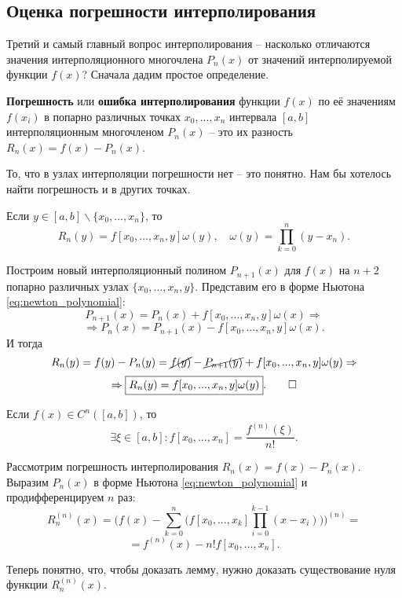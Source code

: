 \documentclass[../main.tex]{subfile}
\begin{document}
\subsection{Оценка погрешности интерполирования}
Третий и самый главный вопрос интерполирования -- насколько отличаются значения
интерполяционного многочлена $P_n(x)$ от значений интерполируемой функции
$f(x)$? Сначала дадим простое определение.

\begin{define}\label{eq:interpolation_error}
	\textbf{Погрешность} или \textbf{ошибка интерполирования} функции $f(x)$
	по её значениям $f(x_i)$ в попарно различных точках $x_0,...,x_n$
	интервала $[a,b]$ интерполяционным многочленом $P_n(x)$ -- это их
	разность $\boxed{R_n(x)=f(x)-P_n(x)}$.
\end{define}

То, что в узлах интерполяции погрешности нет -- это понятно. Нам бы хотелось
найти погрешность и в других точках.

\begin{lemma}\label{eq:interpolation_error_form}
	Если $y\in[a,b]\backslash\{x_0,...,x_n\}$, то
	\[R_n(y)=f[x_0,...,x_n,y]\omega(y),\quad
	\omega(y)=\prod_{k=0}^{n}(y-x_n).\]
\end{lemma}

\beginproof

	Построим новый интерполяционный полином $P_{n+1}(x)$ для $f(x)$ на
	$n+2$ попарно различных узлах $\{x_0,...,x_n,y\}$. Представим его в
	форме Ньютона \eqref{eq:newton_polynomial}:
	\[P_{n+1}(x)=P_n(x)+f[x_0,...,x_n,y]\omega(x)\Rightarrow\]
	\[\Rightarrow P_n(x)=P_{n+1}(x)-f[x_0,...,x_n,y]\omega(x).\]
	И тогда
	\[R_n(y)=f(y)-P_n(y)=\cancel{f(y)}-\cancel{P_{n+1}(y)}+f[x_0,...,x_n,y]
	\omega(y)\Rightarrow\]
	\[\Rightarrow \boxed{R_n(y)=f[x_0,...,x_n,y]\omega(y)}.\qed\]

\begin{lemma}\label{eq:xi_in_ab}
	Если $f(x)\in C^n([a,b])$, то
	\[\exists\xi\in[a,b]:f[x_0,...,x_n] = \frac{f^{(n)}(\xi)}{n!}.\]
\end{lemma}

\beginproof

	Рассмотрим погрешность интерполирования $R_n(x)=f(x)-P_n(x)$. Выразим
	$P_n(x)$ в форме Ньютона \eqref{eq:newton_polynomial} и
	продифференцируем $n$ раз:
	\[R_n^{(n)}(x) = \Big(f(x) - \sum_{k=0}^{n}\big(f[x_0,...,x_k]\prod_
	{i=0}^{k-1}(x-x_i)\big)\Big)^{(n)}=\]
	\[=f^{(n)}(x) - n!f[x_0,...,x_n].\]

	Теперь понятно, что, чтобы доказать лемму, нужно доказать
	существование нуля функции $R_n^{(n)}(x)$.
\end{document}
